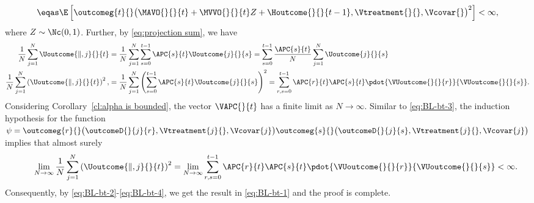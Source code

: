 \begin{enumerate}[label=(\alph*)]
\begin{equation}
\begin{aligned}
            \eqas
            \E\left[
            \outcomeg{t}{} \big(\MAVO{}{}{t} + \MVVO{}{}{t} Z + \Houtcome{}{}{t-1}, \Vtreatment{}{}, \Vcovar{}\big)^2
            \right]  < \infty,
        \end{aligned}
        \end{equation}
        where $Z \sim \Nc(0,1)$. Further, by \eqref{eq:projection sum}, we have
        \begin{align*}
            \frac{1}{N}
            \sum_{j=1}^N
            \Uoutcome{\parallel,j}{}{t}
            &=
            \frac{1}{N}
            \sum_{j=1}^N
            \sum_{s=0}^{t-1} \APC{s}{t} \Uoutcome{j}{}{s}
            =
            \sum_{s=0}^{t-1}
            \frac{\APC{s}{t}}{N}
            \sum_{j=1}^N
            \Uoutcome{j}{}{s}
            \\
            \frac{1}{N}
            \sum_{j=1}^N
            \left(\Uoutcome{\parallel,j}{}{t}\right)^2,
            &=
            \frac{1}{N}
            \sum_{j=1}^N
            \left(
            \sum_{s=0}^{t-1} \APC{s}{t} \Uoutcome{j}{}{s}
            \right)^2
            =
            \sum_{r,s=0}^{t-1} \APC{r}{t} \APC{s}{t} \pdot{\VUoutcome{}{}{r}}{\VUoutcome{}{}{s}}.
        \end{align*}
        Considering Corollary~\ref{cl:alpha is bounded}, the vector $\VAPC{}{t}$ has a finite limit as $N\rightarrow \infty$. Similar to \eqref{eq:BL-bt-3}, the induction hypothesis for the function $\psi = \outcomeg{r}{}\big(\outcomeD{}{j}{r},\Vtreatment{j}{},\Vcovar{j}\big) \outcomeg{s}{}\big(\outcomeD{}{j}{s},\Vtreatment{j}{},\Vcovar{j}\big)$ implies that almost surely
        \begin{align}
            \label{eq:BL-bt-4}
            \quad\quad
            \lim_{N\rightarrow \infty}
            \frac{1}{N}
            \sum_{j=1}^N
            \left(\Uoutcome{\parallel,j}{}{t}\right)^2
            =
            \lim_{N\rightarrow \infty}
            \sum_{r,s=0}^{t-1} \APC{r}{t} \APC{s}{t} \pdot{\VUoutcome{}{}{r}}{\VUoutcome{}{}{s}}
            < \infty.
        \end{align}
        Consequently, by \eqref{eq:BL-bt-2}-\eqref{eq:BL-bt-4}, we get the result in \eqref{eq:BL-bt-1} and the proof is complete. \ep


\end{enumerate}
